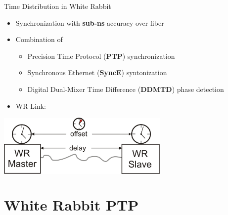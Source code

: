 \documentclass[compress,red]{beamer}
\begin{document}
\begin{frame}{Time Distribution in White Rabbit}

  \begin{itemize}
    \item Synchronization with {\bf sub-ns} accuracy over fiber
    \item Combination of
	\begin{itemize}
	  \item Precision Time Protocol ({\bf PTP}) synchronization
	  \item Synchronous Ethernet ({\bf SyncE}) syntonization
	  \item Digital Dual-Mixer Time Difference ({\bf DDMTD}) phase detection
	\end{itemize}
    \item WR Link:
  \end{itemize}

  \begin{center}
  \includegraphics[height=3cm]{protocol/wrLink.pdf}
  \end{center}

\end{frame}
\section{White Rabbit PTP}
\end{document}
